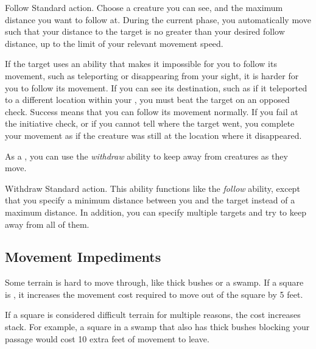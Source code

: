         \begin{activeability}{Follow}
            \abilityusagetime Standard action.
            \rankline
            Choose a creature you can see, and the maximum distance you want to follow at.
            During the current phase, you automatically move such that your distance to the target is no greater than your desired follow distance, up to the limit of your relevant movement speed.

            If the target uses an ability that makes it impossible for you to follow its movement, such as teleporting or disappearing from your sight, it is harder for you to follow its movement.
            If you can see its destination, such as if it teleported to a different location within your , you must beat the target on an opposed  check.
            Success means that you can follow its movement normally.
            If you fail at the initiative check, or if you cannot tell where the target went, you complete your movement as if the creature was still at the location where it disappeared.
        \end{activeability}

        \label{Withdraw} As a , you can use the \textit{withdraw} ability to keep away from creatures as they move.

        \begin{activeability}{Withdraw}
            \abilityusagetime Standard action.
            \rankline
            This ability functions like the \textit{follow} ability, except that you specify a minimum distance between you and the target instead of a maximum distance.
            In addition, you can specify multiple targets and try to keep away from all of them.
        \end{activeability}

    \subsection{Movement Impediments}

        \label{Difficult Terrain}
        Some terrain is hard to move through, like thick bushes or a swamp.
        If a square is , it increases the movement cost required to move out of the square by 5 feet.

        If a square is considered difficult terrain for multiple reasons, the cost increases stack.
        For example, a square in a swamp that also has thick bushes blocking your passage would cost 10 extra feet of movement to leave.

